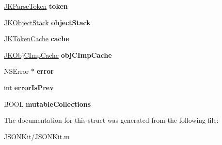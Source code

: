 \begin{DoxyCompactItemize}
\item 
\hypertarget{struct_j_k_parse_state_a6f83002325505e9ed5e773ceb67dde61}{\hyperlink{struct_j_k_parse_token}{J\+K\+Parse\+Token} {\bfseries token}}\label{struct_j_k_parse_state_a6f83002325505e9ed5e773ceb67dde61}

\item 
\hypertarget{struct_j_k_parse_state_a7791f3bf2c8783211532137805d8d840}{\hyperlink{struct_j_k_object_stack}{J\+K\+Object\+Stack} {\bfseries object\+Stack}}\label{struct_j_k_parse_state_a7791f3bf2c8783211532137805d8d840}

\item 
\hypertarget{struct_j_k_parse_state_ab2ca3852fea527ab91bd92c88f815071}{\hyperlink{struct_j_k_token_cache}{J\+K\+Token\+Cache} {\bfseries cache}}\label{struct_j_k_parse_state_ab2ca3852fea527ab91bd92c88f815071}

\item 
\hypertarget{struct_j_k_parse_state_a624df08c0fa58d317dc51d51c24f66ad}{\hyperlink{struct_j_k_obj_c_imp_cache}{J\+K\+Obj\+C\+Imp\+Cache} {\bfseries obj\+C\+Imp\+Cache}}\label{struct_j_k_parse_state_a624df08c0fa58d317dc51d51c24f66ad}

\item 
\hypertarget{struct_j_k_parse_state_aac482928f44dcfaf76ae8c433c55275a}{N\+S\+Error $\ast$ {\bfseries error}}\label{struct_j_k_parse_state_aac482928f44dcfaf76ae8c433c55275a}

\item 
\hypertarget{struct_j_k_parse_state_af0f3b08c1e9ff308b882b8ccd7d82f81}{int {\bfseries error\+Is\+Prev}}\label{struct_j_k_parse_state_af0f3b08c1e9ff308b882b8ccd7d82f81}

\item 
\hypertarget{struct_j_k_parse_state_a8df957ed41d5c7ac5f4d38ebb1bc0f73}{B\+O\+O\+L {\bfseries mutable\+Collections}}\label{struct_j_k_parse_state_a8df957ed41d5c7ac5f4d38ebb1bc0f73}

\end{DoxyCompactItemize}


The documentation for this struct was generated from the following file\+:\begin{DoxyCompactItemize}
\item 
J\+S\+O\+N\+Kit/J\+S\+O\+N\+Kit.\+m\end{DoxyCompactItemize}
